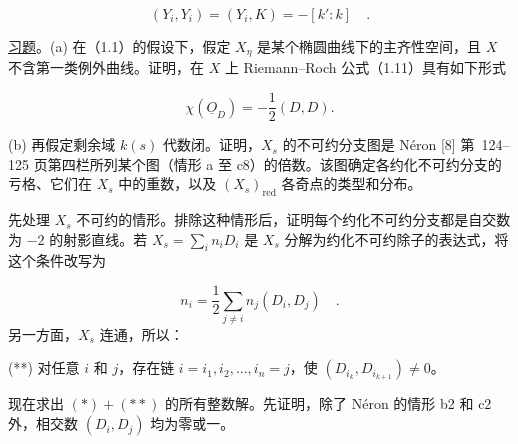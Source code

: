 \begin{equation*}
(Y_i,Y_i)=(Y_i,K)=-[k':k] \quad .
\end{equation*}

\underline{习题}。(a) 在（1.1）的假设下，假定 $X_\eta$ 是某个椭圆曲线下的主齐性空间，且 $X$ 不含第一类例外曲线。证明，在 $X$ 上 Riemann--Roch 公式（1.11）具有如下形式

\begin{equation*}
\chi(\underline{O}_D)=-\frac12(D,D).
\end{equation*}


(b) 再假定剩余域 $k(s)$ 代数闭。证明，$X_s$ 的不可约分支图是 Néron [8] 第~124--125 页第四栏所列某个图（情形 a 至 c8）的倍数。该图确定各约化不可约分支的亏格、它们在 $X_s$ 中的重数，以及 $(X_s)_{\mathrm{red}}$ 各奇点的类型和分布。

先处理 $X_s$ 不可约的情形。排除这种情形后，证明每个约化不可约分支都是自交数为 $-2$ 的射影直线。若 $X_s=\sum_i n_iD_i$ 是 $X_s$ 分解为约化不可约除子的表达式，将这个条件改写为

\begin{equation}\tag{*}
n_i=\frac12\sum_{j\ne i}n_j(D_i,D_j) \quad .
\end{equation}
另一方面，$X_s$ 连通，所以：

(**) 对任意 $i$ 和 $j$，存在链 $i=i_1,i_2,\ldots,i_n=j$，使 $(D_{i_k},D_{i_{k+1}})\ne0$。

现在求出 $(*)+(**)$ 的所有整数解。先证明，除了 Néron 的情形 b2 和 c2 外，相交数 $(D_i,D_j)$ 均为零或一。

